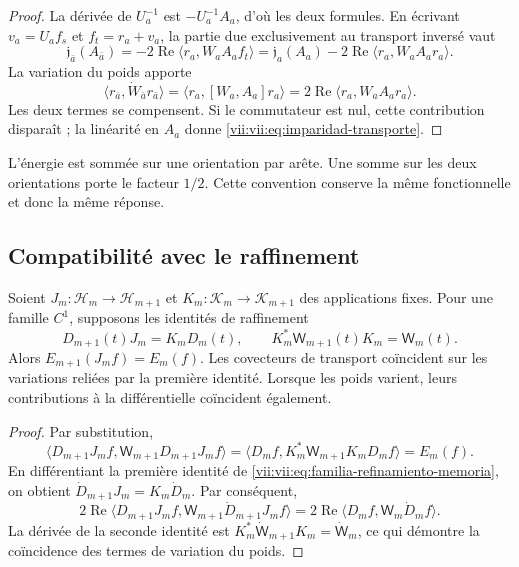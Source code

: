 \begin{proof}
La dérivée de \(U_a^{-1}\) est \(-U_a^{-1}A_a\), d'où les deux formules. En écrivant \(v_a=U_af_s\) et \(f_t=r_a+v_a\), la partie due exclusivement au transport inversé vaut
\[
 \mathfrak j_{\bar a}(A_{\bar a})
 =-2\operatorname{Re}\langle r_a,W_aA_af_t\rangle
 =\mathfrak j_a(A_a)
   -2\operatorname{Re}\langle r_a,W_aA_ar_a\rangle.
\]
La variation du poids apporte
\[
 \langle r_{\bar a},\dot W_{\bar a}r_{\bar a}\rangle
 =\langle r_a,[W_a,A_a]r_a\rangle
 =2\operatorname{Re}\langle r_a,W_aA_ar_a\rangle.
\]
Les deux termes se compensent. Si le commutateur est nul, cette contribution
disparaît ; la linéarité en \(A_a\) donne
\eqref{vii:vii:eq:imparidad-transporte}.
\end{proof}

L'énergie est sommée sur une orientation par arête. Une somme sur les deux
orientations porte le facteur \(1/2\). Cette convention conserve la même
fonctionnelle et donc la même réponse.

\subsection{Compatibilité avec le raffinement}
\label{vii:vii:subsec:refinamiento-respuesta}

\begin{theorem}
\label{vii:vii:thm:refinamiento-respuesta}
Soient \(J_m:\mathcal H_m\to\mathcal H_{m+1}\) et
\(K_m:\mathcal K_m\to\mathcal K_{m+1}\) des applications fixes.
Pour une famille \(C^1\), supposons les identités de raffinement
\begin{equation}
 D_{m+1}(t)J_m=K_mD_m(t),\qquad
 K_m^*\mathsf W_{m+1}(t)K_m=\mathsf W_m(t).
 \label{vii:vii:eq:familia-refinamiento-memoria}
\end{equation}
Alors \(E_{m+1}(J_mf)=E_m(f)\). Les covecteurs de transport coïncident sur les variations reliées par la première identité. Lorsque les poids varient, leurs contributions à la différentielle coïncident également.
\end{theorem}

\begin{proof}
Par substitution,
\[
 \langle D_{m+1}J_mf,\mathsf W_{m+1}D_{m+1}J_mf\rangle
 =\langle D_mf,K_m^*\mathsf W_{m+1}K_mD_mf\rangle=E_m(f).
\]
En différentiant la première identité de
\eqref{vii:vii:eq:familia-refinamiento-memoria}, on obtient
\(\dot D_{m+1}J_m=K_m\dot D_m\). Par conséquent,
\[
 2\operatorname{Re}
 \langle D_{m+1}J_mf,\mathsf W_{m+1}\dot D_{m+1}J_mf\rangle
 =2\operatorname{Re}\langle D_mf,\mathsf W_m\dot D_mf\rangle.
\]
La dérivée de la seconde identité est
\(K_m^*\dot{\mathsf W}_{m+1}K_m=\dot{\mathsf W}_m\), ce qui démontre
la coïncidence des termes de variation du poids.
\end{proof}

